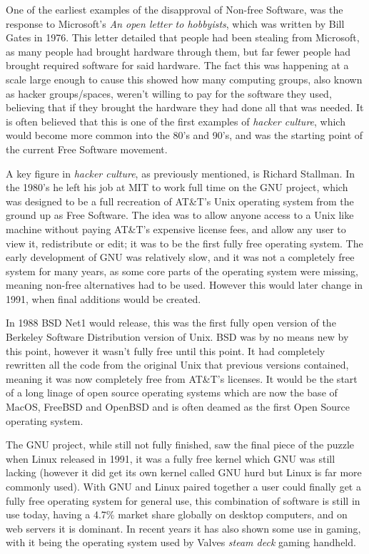 \documentclass[a4paper,12pt]{article}
\begin{document}
{One of the earliest examples of the disapproval of Non-free Software, was the response to Microsoft's 
\textit{An open letter to hobbyists}, which was written by Bill Gates in 1976. This letter detailed 
that people had been stealing from Microsoft, as many people had brought hardware through 
them, but far fewer people had brought required software for said hardware. The fact this was happening 
at a scale large enough to cause this showed how many computing groups, also known as hacker groups/spaces, 
weren't willing to pay for the software they used, believing that if they brought the hardware they had done 
all that was needed\cite{OPENletter}. It is often believed that this is one of the first examples 
of \textit{hacker culture}, which would become more common into the 80's and 90's, and was the 
starting point of the current Free Software movement.

A key figure in \textit{hacker culture}, as previously mentioned, is Richard Stallman. In the 
 1980's he left his job at MIT to work full time on the GNU project, which was designed
to be a full recreation of AT\&T's Unix operating system from the ground up as Free Software. 
The idea was to allow anyone access to a Unix like machine without paying AT\&T's expensive license 
fees, and allow any user to view it, redistribute or edit; it was to be the first fully free 
operating system. The early development of GNU was relatively slow, and it was not a completely free 
system for many years, as some core parts of the operating system were missing, meaning non-free 
alternatives had to be used. However this would later change in 1991, when final additions would
be created.

In 1988 BSD Net1 would release\cite{BSDnet1}, this was the first fully open version of the Berkeley 
Software Distribution version of Unix. BSD was by no means new by this point, however it wasn't 
fully free until this point. It had completely rewritten all the code from the original 
Unix that previous versions contained, meaning it was now completely free from AT\&T's licenses.
It would be the start of a long linage of open source operating systems which are now the base
of MacOS, FreeBSD and OpenBSD and is often deamed as the first Open Source operating system.

The GNU project, while still not fully finished, saw the final piece of the puzzle when 
Linux\cite{LINUX} released in 1991, it was a fully free kernel which GNU was still lacking (however 
it did get its own kernel called GNU hurd but Linux is far more commonly used). With GNU and Linux 
paired together a user could finally get a fully free operating system for general use, this 
combination of software is still in use today, having a 4.7\% market share globally on desktop
computers\cite{LINUXmarket}, and on web servers it is dominant. In recent years it has also shown
some use in gaming, with it being the operating system used by Valves \textit{steam deck} gaming 
handheld\cite{STEAMdeck}.

}
\end{document}
